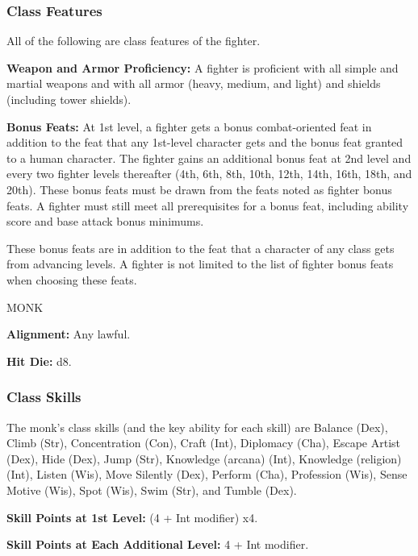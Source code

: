 \documentclass{article}
\begin{document}
\vspace{12pt}
\subsubsection*{\textbf{Class Features}}

All of the following are class features of the fighter.

\textbf{Weapon and Armor Proficiency: }A fighter is proficient with all simple 
and martial weapons and with all armor (heavy, medium, and light) and shields (including 
tower shields).

\textbf{Bonus Feats:} At 1st level, a fighter gets a bonus combat-oriented feat 
in addition to the feat that any 1st-level character gets and the bonus feat granted 
to a human character. The fighter gains an additional bonus feat at 2nd level and 
every two fighter levels thereafter (4th, 6th, 8th, 10th, 12th, 14th, 16th, 18th, 
and 20th). These bonus feats must be drawn from the feats noted as fighter bonus 
feats. A fighter must still meet all prerequisites for a bonus feat, including 
ability score and base attack bonus minimums.

These bonus feats are in addition to the feat that a character of any class gets 
from advancing levels. A fighter is not limited to the list of fighter bonus feats 
when choosing these feats.

\vspace{12pt}
{\LARGE{}MONK}

\textbf{Alignment:} Any lawful.

\textbf{Hit Die:} d8.

\vspace{12pt}
\subsubsection*{\textbf{Class Skills}}

The monk's class skills (and the key ability for each skill) are Balance (Dex), 
Climb (Str), Concentration (Con), Craft (Int), Diplomacy (Cha), Escape Artist (Dex), 
Hide (Dex), Jump (Str), Knowledge (arcana) (Int), Knowledge (religion) (Int), Listen 
(Wis), Move Silently (Dex), Perform (Cha), Profession (Wis), Sense Motive (Wis), 
Spot (Wis), Swim (Str), and Tumble (Dex).

\textbf{Skill Points at 1st Level:} (4 + Int modifier) x$ $4.

\textbf{Skill Points at Each Additional Level:} 4 + Int modifier.
\end{document}
